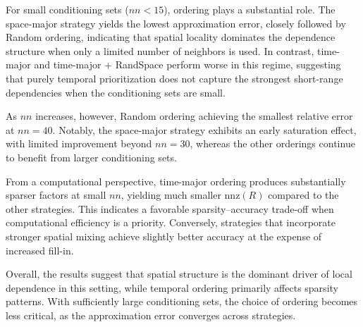 \documentclass[12pt]{article}
\begin{document}
For small conditioning sets ($nn <15$), ordering plays a substantial role. The space-major strategy yields the lowest approximation error, closely followed by Random ordering, indicating that spatial locality dominates the dependence structure when only a limited number of neighbors is used. In contrast, time-major and time-major + RandSpace perform worse in this regime, suggesting that purely temporal prioritization does not capture the strongest short-range dependencies when the conditioning sets are small.

As $nn$ increases, however, Random ordering achieving the smallest relative error at $nn = 40$. Notably, the space-major strategy exhibits an early saturation effect, with limited improvement beyond $nn = 30$, whereas the other orderings continue to benefit from larger conditioning sets.

From a computational perspective, time-major ordering produces substantially sparser factors at small $nn$, yielding much smaller $\mathrm{nnz}(R)$ compared to the other strategies. This indicates a favorable sparsity--accuracy trade-off when computational efficiency is a priority. Conversely, strategies that incorporate stronger spatial mixing achieve slightly better accuracy at the expense of increased fill-in.

Overall, the results suggest that spatial structure is the dominant driver of local dependence in this setting, while temporal ordering primarily affects sparsity patterns. With sufficiently large conditioning sets, the choice of ordering becomes less critical, as the approximation error converges across strategies.
\end{document}
